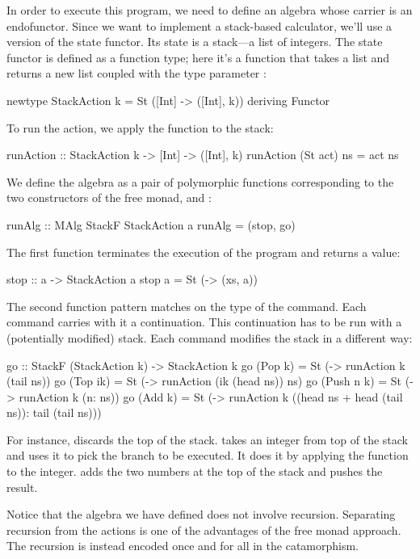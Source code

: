 \documentclass[DaoFP]{subfiles}
\begin{document}
In order to execute this program, we need to define an algebra whose carrier is an endofunctor. Since we want to implement a stack-based calculator, we'll use a version of the state functor. Its state is a stack---a list of integers. The state functor is defined as a function type; here it's a function that takes a list and returns a new list coupled with the type parameter :
\begin{haskell}
newtype StackAction k = St ([Int] -> ([Int], k))
  deriving Functor
\end{haskell}

To run the action, we apply the function to the stack:
\begin{haskell}
runAction :: StackAction k -> [Int] -> ([Int], k)
runAction (St act) ns = act ns
\end{haskell}

We define the algebra as a pair of polymorphic functions corresponding to the two constructors of the free monad,  and :
\begin{haskell}
runAlg :: MAlg StackF StackAction a
runAlg = (stop, go)
\end{haskell}
The first function terminates the execution of the program and returns a value:
\begin{haskell}
stop :: a -> StackAction a
stop a = St (\xs -> (xs, a))
\end{haskell}
The second function pattern matches on the type of the command. Each command carries with it a continuation. This continuation has to be run with a (potentially modified) stack. Each command modifies the stack in a different way:
\begin{haskell}
go :: StackF (StackAction k) -> StackAction k
go (Pop k)    = St (\ns -> runAction k (tail ns))
go (Top ik)   = St (\ns -> runAction (ik (head ns)) ns)
go (Push n k) = St (\ns -> runAction k (n: ns))
go (Add k)    = St (\ns -> runAction k 
                   ((head ns + head (tail ns)): tail (tail ns)))
\end{haskell}
For instance,  discards the top of the stack.  takes an integer from top of the stack and uses it to pick the branch to be executed. It does it by applying the function  to the integer.  adds the two numbers at the top of the stack and pushes the result. 

Notice that the algebra we have defined does not involve recursion. Separating recursion from the actions is one of the advantages of the free monad approach. The recursion is instead encoded once and for all in the catamorphism. 
\end{document}
